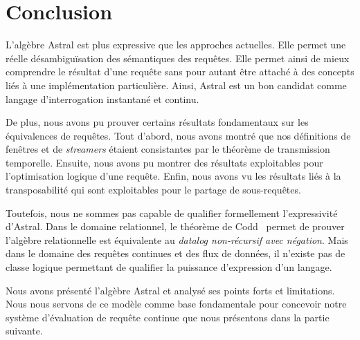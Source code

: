 \section{Conclusion}\label{sec:valid:expressivite:conclusion}
L'algèbre Astral est plus expressive que les approches actuelles. Elle permet une réelle désambiguïsation des sémantiques des requêtes. Elle permet ainsi de mieux comprendre le résultat d'une requête sans pour autant être attaché à des concepts liés à une implémentation particulière. Ainsi, Astral est un bon candidat comme langage d'interrogation instantané et continu.

De plus, nous avons pu prouver certains résultats fondamentaux sur les équivalences de requêtes. Tout d'abord, nous avons montré que nos définitions de fenêtres et de \textit{streamers} étaient consistantes par le théorème de transmission temporelle. Ensuite, nous avons pu montrer des résultats exploitables pour l'optimisation logique d'une requête. Enfin, nous avons vu les résultats liés à la transposabilité qui sont exploitables pour le partage de sous-requêtes.

Toutefois, nous ne sommes pas capable de qualifier formellement l'expressivité d'Astral. Dans le domaine relationnel, le théorème de Codd~\cite{Codd:theorem} permet de prouver l'algèbre relationnelle est équivalente au \textit{datalog non-récursif avec négation}. Mais dans le domaine des requêtes continues et des flux de données, il n'existe pas de classe logique permettant de qualifier la puissance d'expression d'un langage.

Nous avons présenté l'algèbre Astral et analysé ses points forts et limitations. Nous nous servons de ce modèle comme base fondamentale pour concevoir notre système d'évaluation de requête continue que nous présentons dans la partie suivante.